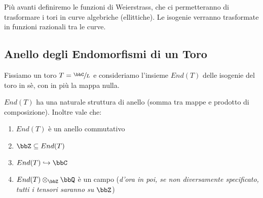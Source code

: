     Più avanti definiremo le funzioni di Weierstrass, che ci permetteranno di trasformare i tori in curve algebriche (ellittiche). Le isogenie verranno trasformate in funzioni razionali tra le curve.

    \subsection{Anello degli Endomorfismi di un Toro}

    Fissiamo un toro $T=\sfrac{\bbC}{L}$ e consideriamo l'insieme $End(T)$ delle isogenie del toro in sè, con in più la mappa nulla.

    \begin{proposizione} $End(T)$ ha una naturale struttura di anello (somma tra mappe e prodotto di composizione). Inoltre vale che:
    \begin{enumerate}
    \item $End(T)$ è un anello commutativo
    \item $\bbZ \subseteq End(T)$
    \item $End(T) \hookrightarrow \bbC$
    \item $End(T) \otimes_{\bbZ} \bbQ$ è un campo ({\it d'ora in poi, se non diversamente specificato, tutti i tensori saranno su $\bbZ$})
    \end{enumerate}
    \end{proposizione}


